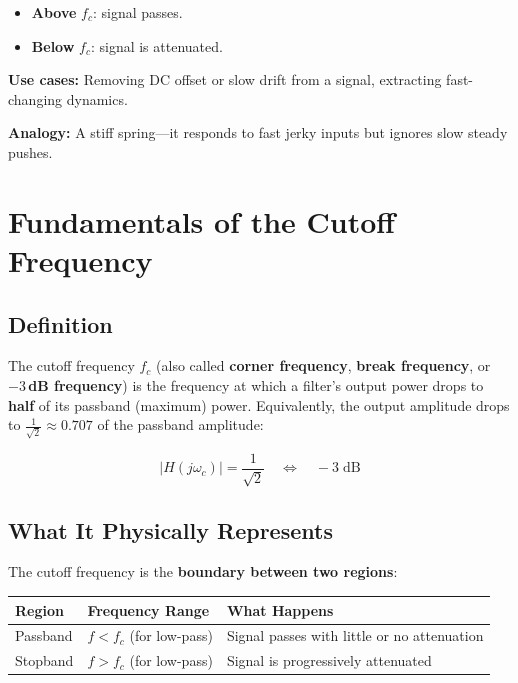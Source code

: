 \documentclass[12pt,a4paper]{article}
\begin{document}
\begin{itemize}
    \item \textbf{Above} $f_c$: signal passes.
    \item \textbf{Below} $f_c$: signal is attenuated.
\end{itemize}

\textbf{Use cases:} Removing DC offset or slow drift from a signal, extracting fast-changing dynamics.

\textbf{Analogy:} A stiff spring---it responds to fast jerky inputs but ignores slow steady pushes.

\section{Fundamentals of the Cutoff Frequency}

\subsection{Definition}

The cutoff frequency $f_c$ (also called \textbf{corner frequency}, \textbf{break frequency}, or \textbf{$-3$\,dB frequency}) is the frequency at which a filter's output power drops to \textbf{half} of its passband (maximum) power. Equivalently, the output amplitude drops to $\frac{1}{\sqrt{2}} \approx 0.707$ of the passband amplitude:

\begin{equation}
    |H(j\omega_c)| = \frac{1}{\sqrt{2}} \quad \Longleftrightarrow \quad -3\;\text{dB}
\end{equation}

\subsection{What It Physically Represents}

The cutoff frequency is the \textbf{boundary between two regions}:

\begin{center}
\begin{tabular}{lll}
    \toprule
    \textbf{Region} & \textbf{Frequency Range} & \textbf{What Happens} \\
    \midrule
    Passband  & $f < f_c$ (for low-pass) & Signal passes with little or no attenuation \\
    Stopband  & $f > f_c$ (for low-pass) & Signal is progressively attenuated \\
    \bottomrule
\end{tabular}
\end{center}
\end{document}
